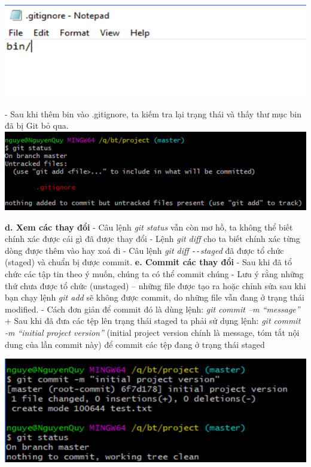 \documentclass[12pt,a4paper]{report}
\begin{document}
	\includegraphics[width=0.8\linewidth]{screenshot010}
	
	\label{fig:screenshot010}
\vskip 0.4cm\vskip 0.4cm
- Sau khi thêm bin vào .gitignore, ta kiếm tra lại trạng thái và thấy thư mục bin đã bị Git bỏ qua.
\vskip 0.4cm
	\includegraphics[width=0.8\linewidth]{screenshot011}

	\label{fig:screenshot011}
\vskip 0.4cm\vskip 0.4cm
{\bf d. Xem các thay đổi} \vskip 0.4cm
- Câu lệnh {\it git status} vẫn còn mơ hồ, ta không thể biết chính xác được cái gì đã được thay đổi\vskip 0.4cm
- Lệnh {\it git diff} cho ta biết chính xác từng dòng được thêm vào hay xoá đi\vskip 0.4cm
- Câu lệnh {\it git diff \texttt{-{}-}staged} đã được tổ chức (staged) và chuẩn bị được commit.\vskip 0.4cm
{\bf e. Commit các thay đổi}\vskip 0.4cm
- Sau khi đã tổ chức các tập tin theo ý muốn, chúng ta có thể commit chúng\vskip 0.4cm
- Lưu ý rằng những thứ chưa được tổ chức (unstaged) – những file được tạo ra hoặc chỉnh sửa sau khi bạn chạy lệnh \textit{git add} sẽ không được commit, do những file vẫn đang ở trạng thái modified.\vskip 0.4cm
- Cách đơn giản để commit đó là dùng lệnh: {\it git commit –m “message”}\vskip 0.4cm
+ Sau khi đã đưa các tệp lên trạng thái staged ta phải sử dụng lệnh: {\it git commit -m “initial project version”} (initial project version chính là message, tóm tắt nội dung của lần commit này) để commit các tệp đang ở trạng thái staged\vskip 0.4cm

	\includegraphics[width=0.8\linewidth]{screenshot012}
\end{document}
